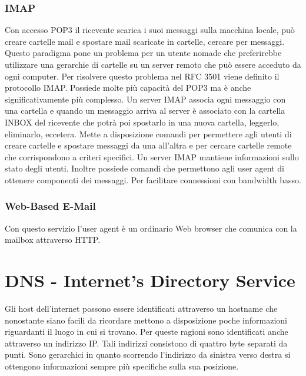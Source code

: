 \subsubsection{IMAP}
Con accesso POP3 il ricevente scarica i suoi messaggi sulla macchina locale, pu\`o creare cartelle mail e spostare mail scaricate in cartelle, cercare per messaggi. Questo paradigma pone un problema per 
un utente nomade che preferirebbe utilizzare una gerarchie di cartelle su un server remoto che pu\`o essere acceduto da ogni computer. Per risolvere questo problema nel RFC 3501 viene definito il protocollo 
IMAP. Possiede molte pi\`u capacit\`a del POP3 ma \`e anche significativamente pi\`u complesso. Un server IMAP associa ogni messaggio con una cartella e quando un messaggio arriva al server \`e associato 
con la cartella INBOX del ricevente che potr\`a poi spostarlo in una nuova cartella, leggerlo, eliminarlo, eccetera. Mette a disposizione comandi per permettere agli utenti di creare cartelle e spostare messaggi
da una all'altra e per cercare cartelle remote che corrispondono a criteri specifici. Un server IMAP mantiene informazioni sullo stato degli utenti. Inoltre possiede comandi che permettono agli user agent di
ottenere componenti dei messaggi. Per facilitare connessioni con bandwidth basso. 
\subsubsection{Web-Based E-Mail}
Con questo servizio l'user agent \`e un ordinario Web browser che comunica con la mailbox attraverso HTTP. 
\section{DNS - Internet's Directory Service}
Gli host dell'internet possono essere identificati attraverso un hostname che nonostante siano facili da ricordare mettono a disposizione poche informazioni riguardanti il luogo in cui si trovano. Per queste
ragioni sono identificati anche attraverso un indirizzo IP. Tali indirizzi consistono di quattro byte separati da punti.  Sono gerarchici in quanto scorrendo l'indirizzo da sinistra verso destra si ottengono 
informazioni sempre pi\`u specifiche sulla sua posizione. 
